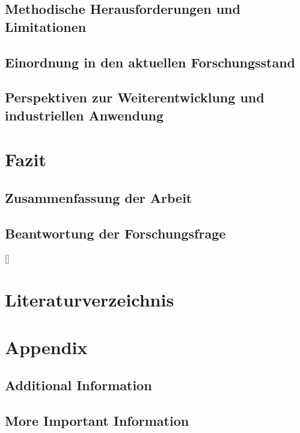 \documentclass[]{stthesis}
\begin{document}
        \section{Methodische Herausforderungen und Limitationen}

        \section{Einordnung in den aktuellen Forschungsstand}

        \section{Perspektiven zur Weiterentwicklung und industriellen Anwendung}

    \chapter{Fazit}
        \section{Zusammenfassung der Arbeit}

        \section{Beantwortung der Forschungsfrage}



  \backmatter

[\bibname]{%
  \chapter{Literaturverzeichnis}
}

\printbibliography[heading=bibliography]

  
  \appendix
  \chapter{Appendix}
  \section{Additional Information}
  \lipsum[1]
  
  \section{More Important Information}
  \lipsum[1]
\end{document}

